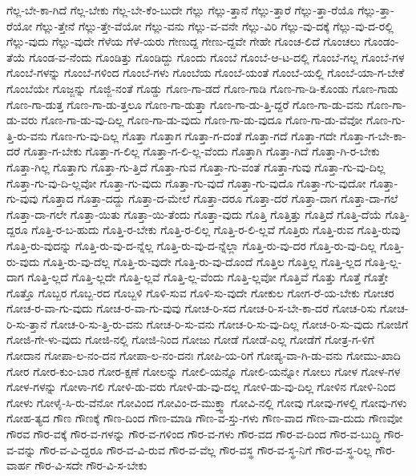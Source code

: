 {ಗೆಲ್ಲ-ಬೇ-ಕಾ-ಗಿದೆ
ಗೆಲ್ಲ-ಬೇಕು
ಗೆಲ್ಲ-ಬೇ-ಕೆಂ-ಬುದೇ
ಗೆಲ್ಲು
ಗೆಲ್ಲು-ತ್ತಾನೆ
ಗೆಲ್ಲು-ತ್ತಾರೆ
ಗೆಲ್ಲು-ತ್ತಾ-ರೆಯೊ
ಗೆಲ್ಲು-ತ್ತಾ-ರೆಯೋ
ಗೆಲ್ಲು-ತ್ತೇನೆ
ಗೆಲ್ಲು-ತ್ತೇ-ವೆಯೋ
ಗೆಲ್ಲು-ವನು
ಗೆಲ್ಲು-ವ-ವನೇ
ಗೆಲ್ಲು-ವಿರಿ
ಗೆಲ್ಲು-ವು-ದಕ್ಕೆ
ಗೆಲ್ಲು-ವು-ದ-ರಲ್ಲಿ
ಗೆಲ್ಲು-ವುದು
ಗೆಲ್ಲು-ವುದೇ
ಗೆಳೆಯ
ಗೆಳೆ-ಯರು
ಗೇಣುದ್ದ
ಗೇಣು-ದ್ದವೇ
ಗೇಹೇ
ಗೊಂಚ-ಲಿದೆ
ಗೊಂಚಲು
ಗೊಂಡಂ-ತೆಯೆ
ಗೊಂಡ-ವ-ನೆಂದು
ಗೊಂಡಿತ್ತು
ಗೊಂಡಿದ್ದು
ಗೊಂದು
ಗೊಂಬೆ
ಗೊಂಬೆ-ಆ-ಟ-ದಲ್ಲಿ
ಗೊಂಬೆ-ಗಲ್ಲ
ಗೊಂಬೆ-ಗಳ
ಗೊಂಬೆ-ಗಳನ್ನು
ಗೊಂಬೆ-ಗಳಿಂದ
ಗೊಂಬೆ-ಗಳು
ಗೊಂಬೆಯ
ಗೊಂಬೆ-ಯಂತೆ
ಗೊಂಬೆ-ಯಲ್ಲಿ
ಗೊಂಬೆ-ಯಾ-ಗ-ಬೇಕೆ
ಗೊಂಬೆಯೇ
ಗೊಜ್ಜನ್ನು
ಗೊಜ್ಜಿ-ನಂತೆ
ಗೊಡ್ಡು
ಗೊಣ-ಗಾ-ಡದೆ
ಗೊಣ-ಗಾಡಿ
ಗೊಣ-ಗಾ-ಡಿ-ಕೊಂಡು
ಗೊಣ-ಗಾಡು
ಗೊಣ-ಗಾ-ಡುತ್ತ
ಗೊಣ-ಗಾ-ಡು-ತ್ತಲೂ
ಗೊಣ-ಗಾ-ಡುತ್ತಾ
ಗೊಣ-ಗಾ-ಡು-ತ್ತಿ-ದ್ದರೆ
ಗೊಣ-ಗಾ-ಡು-ವನು
ಗೊಣ-ಗಾ-ಡು-ವರು
ಗೊಣ-ಗಾ-ಡು-ವು-ದಿಲ್ಲ
ಗೊಣ-ಗಾ-ಡು-ವುದು
ಗೊಣ-ಗಾ-ಡು-ವುದೂ
ಗೊಣ-ಗಾ-ಡು-ವೆವೋ
ಗೊಣ-ಗು-ತ್ತಿ-ರು-ವನು
ಗೊಣ-ಗು-ವು-ದಿಲ್ಲ
ಗೊತ್ತಾ
ಗೊತ್ತಾಗ
ಗೊತ್ತಾ-ಗ-ದಂತೆ
ಗೊತ್ತಾ-ಗದೆ
ಗೊತ್ತಾ-ಗದೇ
ಗೊತ್ತಾ-ಗ-ಬೇ-ಕಾ-ದರೆ
ಗೊತ್ತಾ-ಗ-ಬೇಕು
ಗೊತ್ತಾ-ಗ-ಲಿಲ್ಲ
ಗೊತ್ತಾ-ಗ-ಲಿ-ಲ್ಲ-ವೆಂದು
ಗೊತ್ತಾಗಿ
ಗೊತ್ತಾ-ಗಿದೆ
ಗೊತ್ತಾ-ಗಿ-ರ-ಬೇಕು
ಗೊತ್ತಾ-ಗಿಲ್ಲ
ಗೊತ್ತಾಗು
ಗೊತ್ತಾ-ಗು-ತ್ತಿದೆ
ಗೊತ್ತಾ-ಗುವ
ಗೊತ್ತಾ-ಗು-ವಂತೆ
ಗೊತ್ತಾ-ಗುವು
ಗೊತ್ತಾ-ಗು-ವು-ದಿಲ್ಲ
ಗೊತ್ತಾ-ಗು-ವು-ದಿ-ಲ್ಲವೋ
ಗೊತ್ತಾ-ಗು-ವುದು
ಗೊತ್ತಾ-ಗು-ವುದೆ
ಗೊತ್ತಾ-ಗು-ವುದೊ
ಗೊತ್ತಾ-ಗು-ವುದೋ
ಗೊತ್ತಾ-ಗು-ವುವು
ಗೊತ್ತಾದ
ಗೊತ್ತಾ-ದದ್ದು
ಗೊತ್ತಾ-ದ-ಮೇಲೆ
ಗೊತ್ತಾ-ದರೂ
ಗೊತ್ತಾ-ದರೆ
ಗೊತ್ತಾ-ದಾಗ
ಗೊತ್ತಾ-ದಾ-ಗಲೆ
ಗೊತ್ತಾ-ದಾ-ಗಲೇ
ಗೊತ್ತಾ-ಯಿತು
ಗೊತ್ತಾ-ಯಿ-ತೆಂದು
ಗೊತ್ತಾ-ವುದು
ಗೊತ್ತಿ
ಗೊತ್ತಿತ್ತು
ಗೊತ್ತಿದೆ
ಗೊತ್ತಿ-ದೆಯೆ
ಗೊತ್ತಿ-ದ್ದರೂ
ಗೊತ್ತಿ-ರ-ಬ-ಹುದು
ಗೊತ್ತಿ-ರ-ಬೇಕು
ಗೊತ್ತಿ-ರ-ಲಿಲ್ಲ
ಗೊತ್ತಿ-ರ-ಲಿ-ಲ್ಲವೆ
ಗೊತ್ತಿರು
ಗೊತ್ತಿ-ರುವ
ಗೊತ್ತಿ-ರುವು
ಗೊತ್ತಿ-ರು-ವುದನ್ನು
ಗೊತ್ತಿ-ರು-ವು-ದ-ನ್ನೆಲ್ಲ
ಗೊತ್ತಿ-ರು-ವು-ದ-ನ್ನೆಲ್ಲಾ
ಗೊತ್ತಿ-ರು-ವು-ದರ
ಗೊತ್ತಿ-ರು-ವು-ದಿಲ್ಲ
ಗೊತ್ತಿ-ರು-ವುದು
ಗೊತ್ತಿ-ರು-ವು-ದೆಲ್ಲ
ಗೊತ್ತಿ-ರು-ವುದೇ
ಗೊತ್ತಿ-ರು-ವು-ದೊಂದೆ
ಗೊತ್ತಿಲ
ಗೊತ್ತಿಲ್ಲ
ಗೊತ್ತಿ-ಲ್ಲದ
ಗೊತ್ತಿ-ಲ್ಲ-ದಾಗ
ಗೊತ್ತಿ-ಲ್ಲದೆ
ಗೊತ್ತಿ-ಲ್ಲದೇ
ಗೊತ್ತಿ-ಲ್ಲವೆ
ಗೊತ್ತಿ-ಲ್ಲ-ವೆಂದು
ಗೊತ್ತಿ-ಲ್ಲವೋ
ಗೊತ್ತಿವೆ
ಗೊತ್ತು
ಗೊತ್ತೆ
ಗೊತ್ತೇ
ಗೊತ್ತೊ
ಗೊಬ್ಬರ
ಗೊಬ್ಬ-ರದ
ಗೊಬ್ಬಳಿ
ಗೊಳಿ-ಸುವ
ಗೊಳಿ-ಸು-ವುದೇ
ಗೋಕುಲ
ಗೋಗ-ರೆ-ಯ-ಬೇಕು
ಗೋಚರ
ಗೋಚ-ರ-ವಾ-ಗು-ವುದು
ಗೋಚ-ರ-ವಾ-ಗು-ವುವು
ಗೋಚ-ರಿ-ಸದ
ಗೋಚ-ರಿ-ಸ-ಬೇ-ಕಾ-ದರೆ
ಗೋಚ-ರಿಸು
ಗೋಚ-ರಿ-ಸು-ತ್ತಾನೆ
ಗೋಚ-ರಿ-ಸು-ತ್ತಿ-ರು-ವನು
ಗೋಚ-ರಿ-ಸು-ವನು
ಗೋಚ-ರಿ-ಸು-ವು-ದಿಲ್ಲ
ಗೋಚ-ರಿ-ಸು-ವುದು
ಗೋಜಿಗೆ
ಗೋಜಿ-ಗೇ-ಳು-ವುದು
ಗೋಜಿ-ನಲ್ಲಿ
ಗೋಜಿ-ನಿಂದ
ಗೋಜು
ಗೋಡೆ
ಗೋಡೆ-ಎಲ್ಲ
ಗೋಡೆಗೆ
ಗೋತ್ರ-ಗ-ಳಿಗೆ
ಗೋದಾನ
ಗೋಪಾ-ಲ-ನಂ-ದನ
ಗೋಪಾ-ಲ-ನಂ-ದನಃ
ಗೋಪಿ-ಯ-ರಿಗೆ
ಗೋಪ್ಯ-ವಾ-ಗಿ-ಡು-ವನು
ಗೋಮು-ಖಾದಿ
ಗೋರ
ಗೋರ-ಕುಂ-ಬಾರ
ಗೋರ-ಕ್ಷಣೆ
ಗೋಲನ್ನು
ಗೋಲಿ-ಯನ್ನೊ
ಗೋಲಿ-ಯನ್ನೋ
ಗೋಲು
ಗೋಳ
ಗೋಳ-ಗಳ
ಗೋಳ-ಗಳನ್ನು
ಗೋಳಾ-ಗಲಿ
ಗೋಳಿ-ಡು-ವರು
ಗೋಳಿ-ಡು-ವು-ದಲ್ಲ
ಗೋಳಿ-ಡು-ವು-ದಿಲ್ಲ
ಗೋಳಿನ
ಗೋಳಿ-ನಿಂದ
ಗೋಳು
ಗೋಳೈ-ಸಿ-ರು-ವೆನೋ
ಗೋವಿಂದ
ಗೋವಿಂ-ದ-ಮುಕ್ತ್ವಾ
ಗೋವಿ-ನಲ್ಲಿ
ಗೋವು
ಗೋವು-ಗಳಲ್ಲಿ
ಗೋವು-ಗಳು
ಗೋಹ-ತ್ಯದ
ಗೌಣ
ಗೌಣಕ್ಕೆ
ಗೌಣ-ದಿಂದ
ಗೌಣ-ಮಾಡಿ
ಗೌಣ-ವ-ಸ್ತು-ಗಳು
ಗೌಣ-ವಾದ
ಗೌಣ-ವಾ-ದುದು
ಗೌಣವೋ
ಗೌರವ
ಗೌರ-ವಕ್ಕೆ
ಗೌರ-ವ-ಗಳನ್ನು
ಗೌರ-ವ-ಗಳಿಂದ
ಗೌರ-ವ-ಗಳು
ಗೌರ-ವದ
ಗೌರ-ವ-ದಿಂದ
ಗೌರ-ವ-ಬುದ್ಧಿ
ಗೌರ-ವ-ವನ್ನು
ಗೌರ-ವ-ವಿ-ದ್ದರೂ
ಗೌರ-ವ-ವಿ-ರುವ
ಗೌರ-ವ-ವೆಲ್ಲ
ಗೌರ-ವಸ್ಥ
ಗೌರ-ವ-ಸ್ಥ-ನಿಗೆ
ಗೌರ-ವ-ಸ್ಥ-ರಿಲ್ಲ
ಗೌರ-ವಾರ್ಹ
ಗೌರ-ವಿ-ಸದೇ
ಗೌರ-ವಿ-ಸ-ಬೇಕು
}
